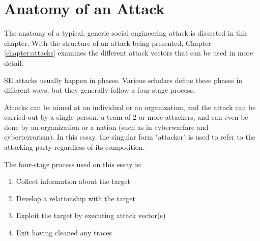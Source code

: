 



\chapter{Anatomy of an Attack\label{chapter:anatomy}}
\begin{comment}

Guides:
    - About 2 pages

TODO:
    [ ] Cover how SE attacks are cyclical

What to cover:
    - The 4-Stage process of SE
        - Gather OSINT
        - Build relationship
        - Exploit relationship / launch the attack
        - Exit / cover traces
    - Cyclical nature of SE attacks
    
Literature:
    - 

\end{comment}

The anatomy of a typical, generic social engineering attack is dissected in this chapter. With the structure of an attack being presented, Chapter \ref{chapter:attacks} examines the different attack vectors that can be used in more detail.

SE attacks usually happen in phases. Various scholars define these phases in different ways, but they generally follow a four-stage process.

Attacks can be aimed at an individual or an organization, and the attack can be carried out by a single person, a team of 2 or more attackers, and can even be done by an organization or a nation (such as in cyberwarfare and cyberterrorism). In this essay, the singular form "attacker" is used to refer to the attacking party regardless of its composition.

The four-stage process used on this essay is:

\begin{enumerate}
    \item Collect information about the target
    \item Develop a relationship with the target
    \item Exploit the target by executing attack vector(s)
    \item Exit having cleaned any traces
\end{enumerate}


